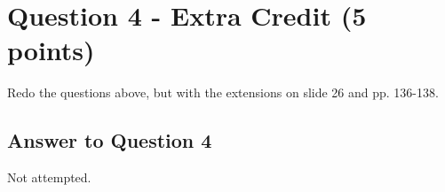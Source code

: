 \documentclass{article}
\begin{document}


\newpage

\section*{Question 4 - Extra Credit (5 points)}

Redo the questions above, but with the extensions on slide 26 and pp. 136-138.

\subsection*{Answer to Question 4}

Not attempted.




\end{document}
